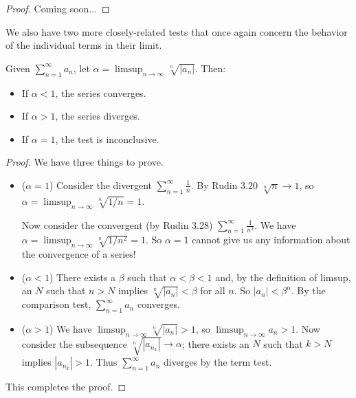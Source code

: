 \documentclass[../m131main.tex]{subfiles}
\begin{document}
\begin{proof}
    Coming soon... %
\end{proof}

We also have two more closely-related tests that once again concern the behavior of the individual terms in their limit.

\begin{theorem}
    Given $\sum_{n=1}^{\infty} a_n$, let $\alpha = \limsup_{n \to \infty} \sqrt[n]{|a_n|}$.
    Then:
    \begin{itemize}
        \item If $\alpha < 1$, the series converges.
        \item If $\alpha > 1$, the series diverges.
        \item If $\alpha = 1$, the test is inconclusive.
    \end{itemize}
\end{theorem}

\begin{proof}
    We have three things to prove.
    \begin{itemize}
        \item ($\alpha = 1$)
        Consider the divergent $\sum_{n=1}^{\infty} \frac{1}{n}$.
        By Rudin 3.20 $\sqrt[n]{n} \to 1$, so $\alpha = \limsup_{n \to \infty} \sqrt[n]{1 / n} = 1$.

        Now consider the convergent (by Rudin 3.28) $\sum_{n=1}^{\infty} \frac{1}{n^2}$.
        We have $\alpha = \limsup_{n \to \infty} \sqrt[n]{1 / n^2} = 1$.
        So $\alpha = 1$ cannot give us any information about the convergence of a series!

        \item ($\alpha < 1$)
        There exists a $\beta$ such that $\alpha < \beta < 1$ and, by the definition of limsup, an $N$ such that $n > N$ implies $\sqrt[n]{|a_n|} < \beta$ for all $n$.
        So $|a_n| < \beta^{n}$.
        By the comparison test, $\sum_{n=1}^{\infty} a_n$ converges.
        
        \item ($\alpha > 1$)
        We have $\limsup_{n \to \infty} \sqrt[n]{|a_n|} > 1$, so $\limsup_{n \to \infty} a_n > 1$.
        Now consider the subsequence $\sqrt[n]{|a_{n_k}|} \to \alpha$; there exists an $N$ such that $k > N$ implies $|a_{n_k}| > 1$.
        Thus $\sum_{n=1}^{\infty} a_n$ diverges by the term test.
    \end{itemize}
    This completes the proof.
\end{proof}
\end{document}
